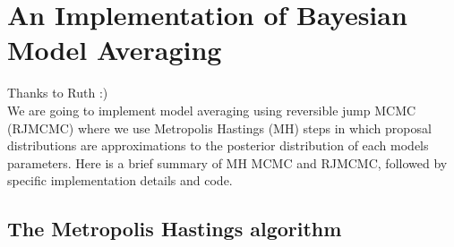 \documentclass[12pt,a4paper]{article}
\begin{document}
\section{An Implementation of Bayesian Model Averaging}

Thanks to Ruth :) \\

We are going to implement model averaging using reversible jump MCMC (RJMCMC) where we use Metropolis Hastings (MH) steps in which proposal distributions are approximations to the posterior distribution of each models parameters.  Here is a brief summary of MH MCMC and RJMCMC, followed by specific implementation details and code.

\subsection{The Metropolis Hastings algorithm}
\end{document}
